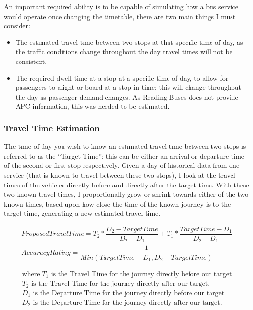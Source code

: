\documentclass{article}
\begin{document}
An important required ability is to be capable of simulating how a bus service would operate once changing the timetable, there are two main things I must consider:

\begin{itemize}
	\item  The estimated travel time between two stops at that specific time of day, as the traffic conditions change throughout the day travel times will not be consistent.
	\item  The required dwell time at a stop at a specific time of day, to allow for passengers to alight or board at a stop in time; this will change throughout the day as passenger demand changes. As Reading Buses does not provide APC information, this was needed to be estimated.
\end{itemize}

 

\subsubsection{Travel Time Estimation}
\par 

The time of day you wish to know an estimated travel time between two stops is referred to as the ``Target Time''; this can be either an arrival or departure time of the second or first stop respectively. Given a day of historical data from one service (that is known to travel between these two stops), I look at the travel times of the vehicles directly before and directly after the target time. With these two known travel times, I proportionally grow or shrink towards either of the two known times, based upon how close the time of the known journey is to the target time, generating a new estimated travel time.



\begin{gather}
	\label{proposedTime}
ProposedTravelTime = T_2 * \dfrac{D_2 - TargetTime}{D_2 - D_1} + T_1 * \dfrac{TargetTime - D_1}{D_2 - D_1} \\
AccuracyRating = \dfrac{1}{Min(TargetTime - D_1, D_2 - TargetTime)} 
	\label{proposedTimeAcr}
\end{gather}

\begin{align*}
	\text{where~$T_1$ is the Travel Time for the journey directly before our target} \\
	\text{$T_2$ is the Travel Time for the journey directly after our target.} \\
	\text{$D_1$ is the Departure Time for the journey directly before our target} \\
	\text{$D_2$ is the Departure Time for the journey directly after our target.}
\end{align*}
\end{document}
